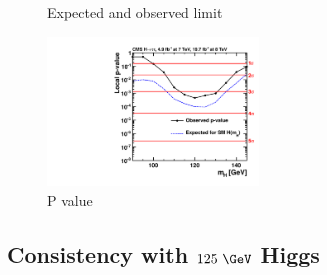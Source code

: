 \begin{figure}[h!]
\caption{Expected and observed limit}
\label{fig:results-limit}
\end{figure}

\begin{figure}[h!]
\includegraphics[width=0.5\textwidth]{plots/htt-sm/cmb_p-value.pdf}
\caption{P value}
\label{fig:results-limit}
\end{figure}


\subsection{Consistency with $125~\GeV$ Higgs}
\label{sec:consistency}

